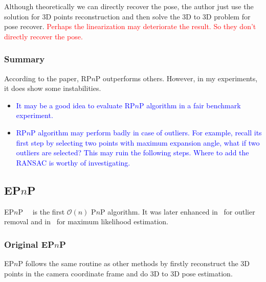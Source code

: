 \documentclass[a4paper]{article}
\begin{document}
Although theoretically we can directly recover the pose, the author just use the solution for $3$D points reconstruction and then solve the $3$D to $3$D problem for pose recover. \textcolor{red}{Perhaps the linearization may deteriorate the result. So they don't directly recover the pose.}

\subsubsection{Summary}
According to the paper, RP$n$P outperforms others. However, in my experiments, it does show some instabilities. 
\begin{itemize}
\item \textcolor{blue}{It may be a good idea to evaluate RP$n$P algorithm in a fair benchmark experiment.}
\item \textcolor{blue}{RP$n$P algorithm may perform badly in case of outliers. For example, recall its first step by selecting two points with maximum expansion angle, what if two outliers are selected? This may ruin the following steps. Where to add the RANSAC is worthy of investigating.}
\end{itemize}

\subsection{EP$n$P}
EP$n$P~\cite{lepetit2009epnp}~\cite{moreno2007accurate} is the first $\mathcal{O}(n)$ P$n$P algorithm. It was later enhanced in~\cite{ferraz2014very} for outlier removal and in~\cite{ferraz2014leveraging} for maximum likelihood estimation.
\subsubsection{Original EP$n$P}
EP$n$P follows the same routine as other methods by firstly reconstruct the $3$D points in the camera coordinate frame and do $3$D to $3$D pose estimation.
\end{document}
